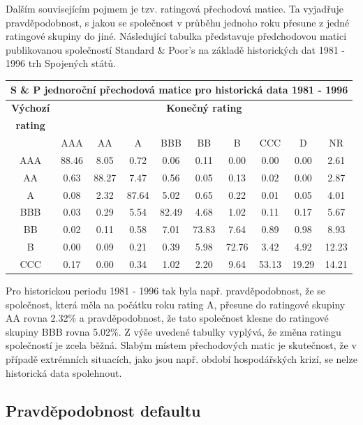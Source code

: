 \documentclass[a4paper]{book}
\begin{document}
Dalším souvisejícím pojmem je tzv. ratingová přechodová matice. Ta vyjadřuje pravděpodobnost, s jakou se společnost v průběhu jednoho roku přesune z jedné ratingové skupiny do jiné. Následující tabulka představuje předchodovou matici publikovanou společností Standard \& Poor's na základě historických dat 1981 - 1996 trh Spojených států.
\begin{center}
\begin{tabular}{c c c c c c c c c c}
\multicolumn{10}{c}{\textbf{S \& P jednoroční přechodová matice pro historická data 1981 - 1996}} \\
\hline
\textbf{Výchozí} & \multicolumn{9}{c}{\textbf{Konečný rating}}\\
\textbf{rating}  & \\
\hline
    & AAA   & AA    & A     & BBB   & BB    & B     & CCC  & D      & NR \\
AAA & 88.46 & 8.05  & 0.72  & 0.06  & 0.11  & 0.00  & 0.00  & 0.00  & 2.61 \\
AA  & 0.63  & 88.27 & 7.47  & 0.56  & 0.05  & 0.13  & 0.02  & 0.00  & 2.87 \\
A   & 0.08  & 2.32  & 87.64 & 5.02  & 0.65  & 0.22  & 0.01  & 0.05  & 4.01 \\
BBB & 0.03  & 0.29  & 5.54  & 82.49 & 4.68  & 1.02  & 0.11  & 0.17  & 5.67 \\
BB  & 0.02  & 0.11  & 0.58  & 7.01  & 73.83 & 7.64  & 0.89  & 0.98  & 8.93 \\
B   & 0.00  & 0.09  & 0.21  & 0.39  & 5.98  & 72.76 & 3.42  & 4.92  & 12.23 \\
CCC & 0.17  & 0.00  & 0.34  & 1.02  & 2.20  & 9.64  & 53.13 & 19.29 & 14.21 \\
\end{tabular}
\end{center}
Pro historickou periodu 1981 - 1996 tak byla např. pravděpodobnost, že se společnost, která měla na počátku roku rating A, přesune do ratingové skupiny AA rovna 2.32\% a pravděpodobnost, že tato společnost klesne do ratingové skupiny BBB rovna 5.02\%. Z výše uvedené tabulky vyplývá, že změna ratingu společností je zcela běžná. Slabým místem přechodových matic je skutečnost, že v případě extrémních situacích, jako jsou např. období hospodářských krizí, se nelze historická data spolehnout.

\subsection{Pravděpodobnost defaultu}
\end{document}
